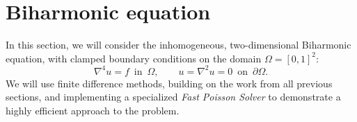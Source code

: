 \section{Biharmonic equation}
\label{sec:PDE}

\newtheorem{theorem}{Theorem}
\newtheorem{lemma}{Lemma}
\theoremstyle{remark}
\newtheorem*{remark}{Remark}

\theoremstyle{definition}
\newtheorem{definition}{Definition}

In this section, we will consider the inhomogeneous, two-dimensional Biharmonic equation, with clamped boundary conditions on the domain $\Omega = [0, 1]^2$:
\begin{equation}\label{eq:PDE}
	\nabla^4 u = f \,\,\, \text{in} \,\,\, \Omega , \qquad u = \nabla^2 u = 0 \,\,\, \text{on} \,\,\, \partial\Omega.
\end{equation}
We will use finite difference methods, building on the work from all previous sections, and implementing a specialized \emph{Fast Poisson Solver} to demonstrate a highly efficient approach to the problem.


